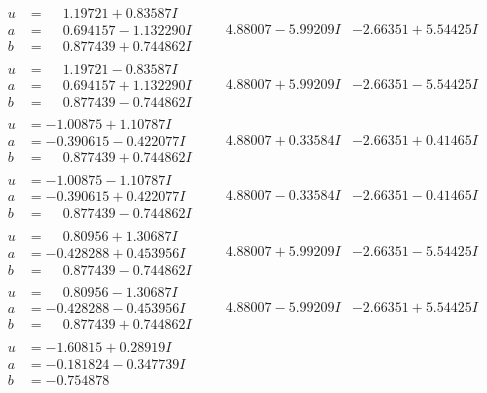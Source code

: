 \documentclass[1p]{elsarticle_modified}
\theoremstyle{definition}
\begin{document}
$$\begin{array}{c|c|c}
\begin{aligned}
u &= \phantom{-}1.19721 + 0.83587 I \\
a &= \phantom{-}0.694157 - 1.132290 I \\
b &= \phantom{-}0.877439 + 0.744862 I\end{aligned}
 & \phantom{-}4.88007 - 5.99209 I & -2.66351 + 5.54425 I \\ \hline\begin{aligned}
u &= \phantom{-}1.19721 - 0.83587 I \\
a &= \phantom{-}0.694157 + 1.132290 I \\
b &= \phantom{-}0.877439 - 0.744862 I\end{aligned}
 & \phantom{-}4.88007 + 5.99209 I & -2.66351 - 5.54425 I \\ \hline\begin{aligned}
u &= -1.00875 + 1.10787 I \\
a &= -0.390615 - 0.422077 I \\
b &= \phantom{-}0.877439 + 0.744862 I\end{aligned}
 & \phantom{-}4.88007 + 0.33584 I & -2.66351 + 0.41465 I \\ \hline\begin{aligned}
u &= -1.00875 - 1.10787 I \\
a &= -0.390615 + 0.422077 I \\
b &= \phantom{-}0.877439 - 0.744862 I\end{aligned}
 & \phantom{-}4.88007 - 0.33584 I & -2.66351 - 0.41465 I \\ \hline\begin{aligned}
u &= \phantom{-}0.80956 + 1.30687 I \\
a &= -0.428288 + 0.453956 I \\
b &= \phantom{-}0.877439 - 0.744862 I\end{aligned}
 & \phantom{-}4.88007 + 5.99209 I & -2.66351 - 5.54425 I \\ \hline\begin{aligned}
u &= \phantom{-}0.80956 - 1.30687 I \\
a &= -0.428288 - 0.453956 I \\
b &= \phantom{-}0.877439 + 0.744862 I\end{aligned}
 & \phantom{-}4.88007 - 5.99209 I & -2.66351 + 5.54425 I \\ \hline\begin{aligned}
u &= -1.60815 + 0.28919 I \\
a &= -0.181824 - 0.347739 I \\
b &= -0.754878\phantom{ +0.000000I}\end{aligned}

\end{array}$$
\end{document}
